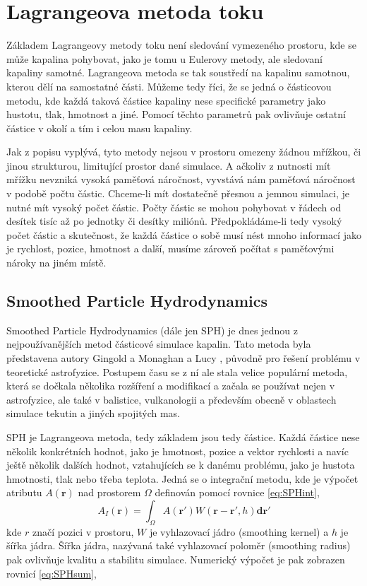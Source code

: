 \section{Lagrangeova metoda toku}
Základem Lagrangeovy metody toku není sledování vymezeného prostoru, kde se může kapalina pohybovat, jako je tomu u Eulerovy metody, ale sledovaní kapaliny samotné. Lagrangeova metoda se tak soustředí na kapalinu samotnou, kterou dělí na samostatné části. Můžeme tedy říci, že se jedná o částicovou metodu, kde každá taková částice kapaliny nese specifické parametry jako hustotu, tlak, hmotnost a jiné. Pomocí těchto parametrů pak ovlivňuje ostatní částice v okolí a tím i celou masu kapaliny.

Jak z popisu vyplývá, tyto metody nejsou v prostoru omezeny žádnou mřížkou, či jinou strukturou, limitující prostor dané simulace. A ačkoliv z nutnosti mít mřížku nevzniká vysoká paměťová náročnost, vyvstává nám paměťová náročnost v podobě počtu částic. Chceme-li mít dostatečně přesnou a jemnou simulaci, je nutné mít vysoký počet částic. Počty částic se mohou pohybovat v řádech od desítek tisíc až po jednotky či desítky miliónů. Předpokládáme-li tedy vysoký počet částic a skutečnost, že každá částice o sobě musí nést mnoho informací jako je rychlost, pozice, hmotnost a další, musíme zároveň počítat s paměťovými nároky na jiném místě. 

\subsection{Smoothed Particle Hydrodynamics}
\label{chapter:SPH}
Smoothed Particle Hydrodynamics (dále jen SPH) je dnes jednou z nejpoužívanějších metod částicové simulace kapalin. Tato metoda byla představena autory Gingold a Monaghan \cite{Monaghan77} a Lucy \cite{Lucy77}, původně pro řešení problému v teoretické astrofyzice. Postupem času se z ní ale stala velice populární metoda, která se dočkala několika rozšíření a modifikací a začala se používat nejen v astrofyzice, ale také v balistice, vulkanologii a především obecně v oblastech simulace tekutin a jiných spojitých mas.

SPH je Lagrangeova metoda, tedy základem jsou tedy částice. Každá částice nese několik konkrétních hodnot, jako je hmotnost, pozice a vektor rychlosti a navíc ještě několik dalších hodnot, vztahujících se k danému problému, jako je hustota hmotnosti, tlak nebo třeba teplota. Jedná se o integrační metodu, kde je výpočet atributu $A(\mathbf{r})$ nad prostorem $\Omega$ definován pomocí rovnice \ref{eq:SPHint},
\begin{equation}
    A_I(\mathbf{r}) = \int_\Omega A(\mathbf{r}')W(\mathbf{r} - \mathbf{r'},h)\mathbf{dr}'
    \label{eq:SPHint}
\end{equation}
kde $r$ značí pozici v prostoru, $W$ je vyhlazovací jádro (smoothing kernel) a $h$ je šířka jádra. Šířka jádra, nazývaná také vyhlazovací poloměr (smoothing radius) pak ovlivňuje kvalitu a stabilitu simulace.
Numerický výpočet je pak zobrazen rovnicí \ref{eq:SPHsum},

